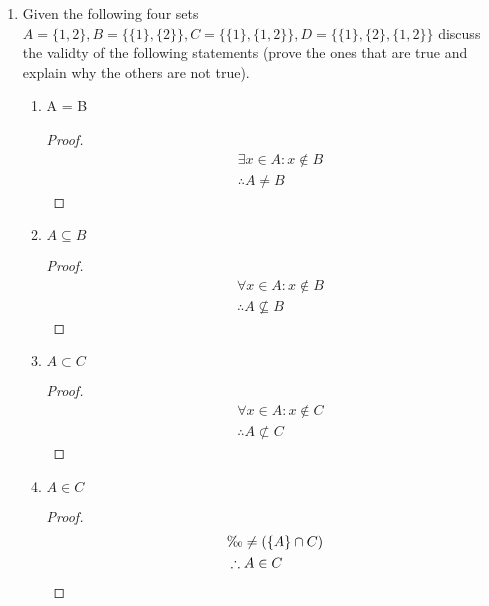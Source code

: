\begin{enumerate}
  \item Given the following four sets
  \begin{math}
    A = \{1, 2\}, B = \{\{1\}, \{2\}\}, C = \{\{1\},\{1, 2\}\}, D = \{\{1\}, \{2\}, \{1, 2\}\}
  \end{math}
  discuss the validty of the following statements (prove the ones that are true and explain why the others are not true).
  \begin{enumerate}
    \item \begin{proposition}
      A = B
    \end{proposition}
    \begin{proof}
      \begin{equation}
        \begin{split}
          & \exists x \in A: x \notin B \\
          & \therefore A \neq B
        \end{split}
      \end{equation}
    \end{proof}

    \item \begin{proposition}
      $A \subseteq B$
    \end{proposition}
    \begin{proof}
      \begin{equation}
        \begin{split}
          & \forall x \in A: x \notin B \\
          & \therefore A \nsubseteq B
        \end{split}
      \end{equation}
    \end{proof}

    \item \begin{proposition}
      $A \subset C$
    \end{proposition}
    \begin{proof}
      \begin{equation}
        \begin{split}
          & \forall x \in A: x \notin C \\
          & \therefore A \not \subset C
        \end{split}
      \end{equation}
    \end{proof}

    \item \begin{proposition}
      $A \in C$
    \end{proposition}
    \begin{proof}
      \begin{equation}
        \begin{split}
          & \O \neq (\{A\} \cap C) \\
          & \therefore A \in C
        \end{split}
      \end{equation}
    \end{proof}

  \end{enumerate}
\end{enumerate}